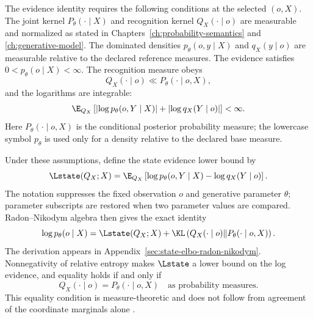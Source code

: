 The evidence identity requires the following conditions at the selected \((o,X)\). The joint kernel \(P_\theta(\mathord\cdot\mid X)\) and recognition kernel \(Q_X(\mathord\cdot\mid o)\) are measurable and normalized as stated in Chapters~\ref{ch:probability-semantics} and \ref{ch:generative-model}. The dominated densities \(p_\theta(o,y\mid X)\) and \(q_X(y\mid o)\) are measurable relative to the declared reference measures. The evidence satisfies \(0<p_\theta(o\mid X)<\infty\). The recognition measure obeys
\begin{equation}
Q_X(\mathord\cdot\mid o)
\ll P_\theta(\mathord\cdot\mid o,X),
\label{eq:recognition-posterior-absolute-continuity}
\end{equation}
and the logarithms are integrable:
\begin{equation}
\E_{Q_X}\left[
\left|\log p_\theta(o,Y\mid X)\right|
+\left|\log q_X(Y\mid o)\right|
\right]<\infty.
\label{eq:state-elbo-log-integrability}
\end{equation}
Here \(P_\theta(\mathord\cdot\mid o,X)\) is the conditional posterior probability measure; the lowercase symbol \(p_\theta\) is used only for a density relative to the declared base measure.

Under these assumptions, define the state evidence lower bound by
\begin{equation}
\Lstate(Q_X;X)
=\E_{Q_X}\left[
\log p_\theta(o,Y\mid X)-\log q_X(Y\mid o)
\right].
\label{eq:state-elbo-definition}
\end{equation}
The notation suppresses the fixed observation \(o\) and generative parameter \(\theta\); parameter subscripts are restored when two parameter values are compared.
Radon--Nikodym algebra then gives the exact identity
\begin{equation}
\log p_\theta(o\mid X)
=\Lstate(Q_X;X)
+\KL\left(
Q_X(\mathord\cdot\mid o)
\middle\Vert
P_\theta(\mathord\cdot\mid o,X)
\right).
\label{eq:state-evidence-identity}
\end{equation}
The derivation appears in Appendix~\ref{sec:state-elbo-radon-nikodym}. Nonnegativity of relative entropy makes \(\Lstate\) a lower bound on the log evidence, and equality holds if and only if
\begin{equation}
Q_X(\mathord\cdot\mid o)
=P_\theta(\mathord\cdot\mid o,X)
\quad\text{as probability measures}.
\label{eq:state-elbo-equality-condition}
\end{equation}
This equality condition is measure-theoretic and does not follow from agreement of the coordinate marginals alone \citep{Kullback1951,Csiszar1967}.

